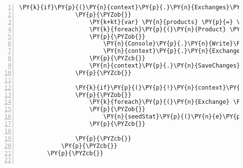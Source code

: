 \begin{Verbatim}[commandchars=\\\{\},numbers=left,firstnumber=1,stepnumber=1,numberblanklines=0]
                \PY{k}{if}\PY{p}{(}\PY{n}{context}\PY{p}{.}\PY{n}{Exchanges}\PY{p}{.}\PY{n}{Any}\PY{p}{(}\PY{p}{)} \PY{p}{=}\PY{p}{=} \PY{k}{false}\PY{p}{)}
                \PY{p}{\PYZob{}}
                    \PY{k+kt}{var} \PY{n}{products} \PY{p}{=} \PY{n}{client}\PY{p}{.}\PY{n}{ProductsService}\PY{p}{.}\PY{n}{GetAllProductsAsync}\PY{p}{(}\PY{p}{)}\PY{p}{.}\PY{n}{Result}\PY{p}{;}
                    \PY{k}{foreach}\PY{p}{(}\PY{n}{Product} \PY{n}{prod} \PY{k}{in} \PY{n}{products}\PY{p}{)}
                    \PY{p}{\PYZob{}}
                        \PY{n}{Console}\PY{p}{.}\PY{n}{Write}\PY{p}{(}\PY{n}{prod}\PY{p}{.}\PY{n}{Id}\PY{p}{.}\PY{n}{ToString}\PY{p}{(}\PY{p}{)}\PY{p}{)}\PY{p}{;}
                        \PY{n}{context}\PY{p}{.}\PY{n}{Exchanges}\PY{p}{.}\PY{n}{Add}\PY{p}{(}\PY{k}{new} \PY{n}{Exchange}\PY{p}{(}\PY{p}{)}\PY{p}{\PYZob{}}\PY{n}{Name} \PY{p}{=} \PY{n}{prod}\PY{p}{.}\PY{n}{Id}\PY{p}{.}\PY{n}{ToString}\PY{p}{(}\PY{p}{)}\PY{p}{\PYZcb{}}\PY{p}{)}\PY{p}{;}
                    \PY{p}{\PYZcb{}}
                    \PY{n}{context}\PY{p}{.}\PY{n}{SaveChanges}\PY{p}{(}\PY{p}{)}\PY{p}{;}
                \PY{p}{\PYZcb{}}

                \PY{k}{if}\PY{p}{(}\PY{p}{!}\PY{n}{context}\PY{p}{.}\PY{n}{Stats}\PY{p}{.}\PY{n}{Any}\PY{p}{(}\PY{p}{)}\PY{p}{)}
                \PY{p}{\PYZob{}}
                    \PY{k}{foreach}\PY{p}{(}\PY{n}{Exchange} \PY{n}{e} \PY{k}{in} \PY{n}{context}\PY{p}{.}\PY{n}{Exchanges}\PY{p}{)}
                    \PY{p}{\PYZob{}}
                        \PY{n}{seedStat}\PY{p}{(}\PY{n}{e}\PY{p}{.}\PY{n}{ExchangeId}\PY{p}{,} \PY{n}{DateTime}\PY{p}{.}\PY{n}{Now}\PY{p}{.}\PY{n}{AddDays}\PY{p}{(}\PY{p}{\PYZhy{}}\PY{l+m}{7}\PY{p}{)}\PY{p}{,} \PY{n}{DateTime}\PY{p}{.}\PY{n}{Now}\PY{p}{,} \PY{n}{context}\PY{p}{)}\PY{p}{;}
                    \PY{p}{\PYZcb{}}
                    
                \PY{p}{\PYZcb{}}
            \PY{p}{\PYZcb{}}
        \PY{p}{\PYZcb{}}


\end{Verbatim}
